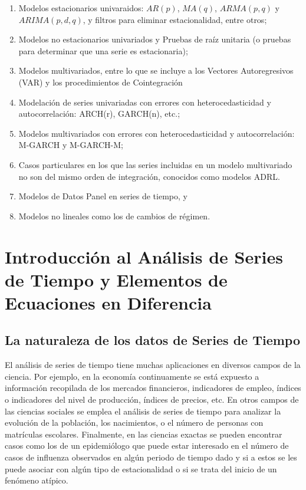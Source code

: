 \documentclass[
]{book}
\begin{document}
\begin{enumerate}
\def\labelenumi{\arabic{enumi}.}
\item
  Modelos estacionarios univaraidos: \(AR(p)\), \(MA(q)\), \(ARMA(p, q)\) y \(ARIMA(p, d, q)\), y filtros para eliminar estacionalidad, entre otros;
\item
  Modelos no estacionarios univariados y Pruebas de raíz unitaria (o pruebas para determinar que una serie es estacionaria);
\item
  Modelos multivariados, entre lo que se incluye a los Vectores Autoregresivos (VAR) y los procedimientos de Cointegración
\item
  Modelación de series univariadas con errores con heterocedasticidad y autocorrelación: ARCH(r), GARCH(n), etc.;
\item
  Modelos multivariados con errores con heterocedasticidad y autocorrelación: M-GARCH y M-GARCH-M;
\item
  Casos particulares en los que las series incluidas en un modelo multivariado no son del mismo orden de integración, conocidos como modelos ADRL.
\item
  Modelos de Datos Panel en series de tiempo, y
\item
  Modelos no lineales como los de cambios de régimen.
\end{enumerate}

\hypertarget{introducciuxf3n-al-anuxe1lisis-de-series-de-tiempo-y-elementos-de-ecuaciones-en-diferencia}{%
\chapter{Introducción al Análisis de Series de Tiempo y Elementos de Ecuaciones en Diferencia}\label{introducciuxf3n-al-anuxe1lisis-de-series-de-tiempo-y-elementos-de-ecuaciones-en-diferencia}}

\hypertarget{la-naturaleza-de-los-datos-de-series-de-tiempo}{%
\section{La naturaleza de los datos de Series de Tiempo}\label{la-naturaleza-de-los-datos-de-series-de-tiempo}}

El análisis de series de tiempo tiene muchas aplicaciones en diversos campos de la ciencia. Por ejemplo, en la economía continuamente se está expuesto a información recopilada de los mercados financieros, indicadores de empleo, índices o indicadores del nivel de producción, índices de precios, etc. En otros campos de las ciencias sociales se emplea el análisis de series de tiempo para analizar la evolución de la población, los nacimientos, o el número de personas con matrículas escolares. Finalmente, en las ciencias exactas se pueden encontrar casos como los de un epidemiólogo que puede estar interesado en el número de casos de influenza observados en algún periodo de tiempo dado y si a estos se les puede asociar con algún tipo de estacionalidad o si se trata del inicio de un fenómeno atípico.
\end{document}
